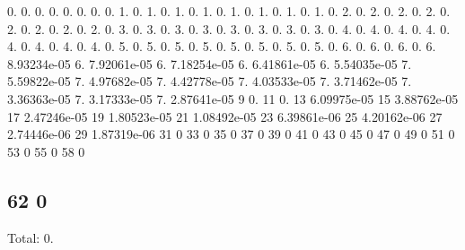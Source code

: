 0. 0. 0. 0. 0. 0. 0. 0. 1. 0. 1. 0. 1. 0. 1. 0. 1. 0. 1. 0. 1. 0. 1. 0. 2. 0. 2. 0. 2. 0. 2. 0. 2. 0. 2. 0. 2. 0. 2. 0. 3. 0. 3. 0. 3. 0. 3. 0. 3. 0. 3. 0. 3. 0. 3. 0. 4. 0. 4. 0. 4. 0. 4. 0. 4. 0. 4. 0. 4. 0. 4. 0. 5. 0. 5. 0. 5. 0. 5. 0. 5. 0. 5. 0. 5. 0. 5. 0. 6. 0. 6. 0. 6. 0. 6. 8.\+93234e-\/05 6. 7.\+92061e-\/05 6. 7.\+18254e-\/05 6. 6.\+41861e-\/05 6. 5.\+54035e-\/05 7. 5.\+59822e-\/05 7. 4.\+97682e-\/05 7. 4.\+42778e-\/05 7. 4.\+03533e-\/05 7. 3.\+71462e-\/05 7. 3.\+36363e-\/05 7. 3.\+17333e-\/05 7. 2.\+87641e-\/05 9 0. 11 0. 13 6.\+09975e-\/05 15 3.\+88762e-\/05 17 2.\+47246e-\/05 19 1.\+80523e-\/05 21 1.\+08492e-\/05 23 6.\+39861e-\/06 25 4.\+20162e-\/06 27 2.\+74446e-\/06 29 1.\+87319e-\/06 31 0 33 0 35 0 37 0 39 0 41 0 43 0 45 0 47 0 49 0 51 0 53 0 55 0 58 0 \subsection*{62 0 }

Total\+: 0. 